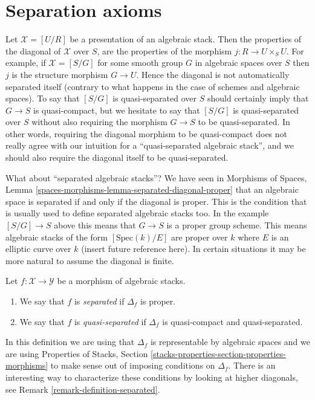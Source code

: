 \section{Separation axioms}
\label{section-separated}

\noindent
Let $\mathcal{X} = [U/R]$ be a presentation of an algebraic stack.
Then the properties of the diagonal of $\mathcal{X}$ over $S$, are
the properties of the morphism $j : R \to U \times_S U$. For example,
if $\mathcal{X} = [S/G]$ for some smooth group $G$ in algebraic spaces
over $S$ then $j$ is the structure morphism $G \to U$. Hence the diagonal
is not automatically separated itself (contrary to what happens in the
case of schemes and algebraic spaces). To say that $[S/G]$ is quasi-separated
over $S$ should certainly imply that $G \to S$ is quasi-compact, but we
hesitate to say that $[S/G]$ is quasi-separated over $S$ without also
requiring the morphism $G \to S$ to be quasi-separated. In other words,
requiring the diagonal morphism to be quasi-compact does not really agree
with our intuition for a ``quasi-separated algebraic stack'', and we should
also require the diagonal itself to be quasi-separated.

\medskip\noindent
What about ``separated algebraic stacks''? We have seen in
Morphisms of Spaces,
Lemma \ref{spaces-morphisms-lemma-separated-diagonal-proper}
that an algebraic space is separated if and only if the diagonal is proper.
This is the condition that is usually used to define separated algebraic
stacks too. In the example $[S/G] \to S$ above this means that $G \to S$
is a proper group scheme. This means algebraic stacks of the form
$[\text{Spec}(k)/E]$ are proper over $k$ where $E$ is an elliptic curve
over $k$ (insert future reference here). In certain situations it may be
more natural to assume the diagonal is finite.

\begin{definition}
\label{definition-morphism-separated}
Let $f : \mathcal{X} \to \mathcal{Y}$ be a morphism of algebraic stacks.
\begin{enumerate}
\item We say that $f$ is {\it separated} if $\Delta_f$ is proper.
\item We say that $f$ is {\it quasi-separated} if $\Delta_f$
is quasi-compact and quasi-separated.
\end{enumerate}
\end{definition}

\noindent
In this definition we are using that $\Delta_f$ is representable by algebraic
spaces and we are using
Properties of Stacks,
Section \ref{stacks-properties-section-properties-morphisms}
to make sense out of imposing conditions on $\Delta_f$.
There is an interesting way to characterize these conditions by looking
at higher diagonals, see
Remark \ref{remark-definition-separated}.






